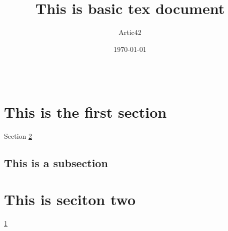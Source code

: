 \def\MYTITLE{This is basic tex document}
\def\MYNAME{Artic42}






    \title{\MYTITLE}
    \author{\MYNAME}
    \date{\today}
    \maketitle

    \thispagestyle{firstPage}
    \begin{abstract}\
    \lipsum[10]
    \end{abstract}

    \section{This is the first section}
    \label{sec:one}Section \ref{sec:two}
    \lipsum[1]
        \subsection{This is a subsection}
        \lipsum[5-6]
    \section{This is seciton two}
    \label{sec:two}\ref{sec:one}
    \lipsum[8-10]
    
